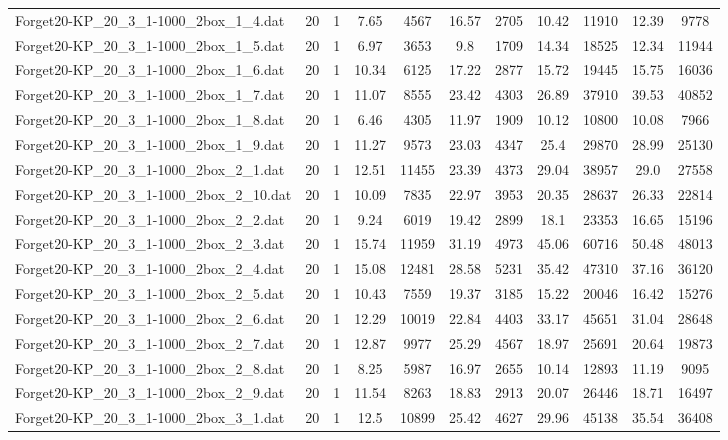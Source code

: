 \begin{table}[!ht]
\begin{tabular}{lcccccccccc}
Forget20-KP\_20\_3\_1-1000\_2box\_1\_4.dat & 20 & 1 & 7.65 & 4567 & 16.57 & 2705 & 10.42 & 11910 & 12.39 & 9778 \\
Forget20-KP\_20\_3\_1-1000\_2box\_1\_5.dat & 20 & 1 & 6.97 & 3653 & 9.8 & 1709 & 14.34 & 18525 & 12.34 & 11944 \\
Forget20-KP\_20\_3\_1-1000\_2box\_1\_6.dat & 20 & 1 & 10.34 & 6125 & 17.22 & 2877 & 15.72 & 19445 & 15.75 & 16036 \\
Forget20-KP\_20\_3\_1-1000\_2box\_1\_7.dat & 20 & 1 & 11.07 & 8555 & 23.42 & 4303 & 26.89 & 37910 & 39.53 & 40852 \\
Forget20-KP\_20\_3\_1-1000\_2box\_1\_8.dat & 20 & 1 & 6.46 & 4305 & 11.97 & 1909 & 10.12 & 10800 & 10.08 & 7966 \\
Forget20-KP\_20\_3\_1-1000\_2box\_1\_9.dat & 20 & 1 & 11.27 & 9573 & 23.03 & 4347 & 25.4 & 29870 & 28.99 & 25130 \\
Forget20-KP\_20\_3\_1-1000\_2box\_2\_1.dat & 20 & 1 & 12.51 & 11455 & 23.39 & 4373 & 29.04 & 38957 & 29.0 & 27558 \\
Forget20-KP\_20\_3\_1-1000\_2box\_2\_10.dat & 20 & 1 & 10.09 & 7835 & 22.97 & 3953 & 20.35 & 28637 & 26.33 & 22814 \\
Forget20-KP\_20\_3\_1-1000\_2box\_2\_2.dat & 20 & 1 & 9.24 & 6019 & 19.42 & 2899 & 18.1 & 23353 & 16.65 & 15196 \\
Forget20-KP\_20\_3\_1-1000\_2box\_2\_3.dat & 20 & 1 & 15.74 & 11959 & 31.19 & 4973 & 45.06 & 60716 & 50.48 & 48013 \\
Forget20-KP\_20\_3\_1-1000\_2box\_2\_4.dat & 20 & 1 & 15.08 & 12481 & 28.58 & 5231 & 35.42 & 47310 & 37.16 & 36120 \\
Forget20-KP\_20\_3\_1-1000\_2box\_2\_5.dat & 20 & 1 & 10.43 & 7559 & 19.37 & 3185 & 15.22 & 20046 & 16.42 & 15276 \\
Forget20-KP\_20\_3\_1-1000\_2box\_2\_6.dat & 20 & 1 & 12.29 & 10019 & 22.84 & 4403 & 33.17 & 45651 & 31.04 & 28648 \\
Forget20-KP\_20\_3\_1-1000\_2box\_2\_7.dat & 20 & 1 & 12.87 & 9977 & 25.29 & 4567 & 18.97 & 25691 & 20.64 & 19873 \\
Forget20-KP\_20\_3\_1-1000\_2box\_2\_8.dat & 20 & 1 & 8.25 & 5987 & 16.97 & 2655 & 10.14 & 12893 & 11.19 & 9095 \\
Forget20-KP\_20\_3\_1-1000\_2box\_2\_9.dat & 20 & 1 & 11.54 & 8263 & 18.83 & 2913 & 20.07 & 26446 & 18.71 & 16497 \\
Forget20-KP\_20\_3\_1-1000\_2box\_3\_1.dat & 20 & 1 & 12.5 & 10899 & 25.42 & 4627 & 29.96 & 45138 & 35.54 & 36408 \\

\end{tabular}
\end{table}

